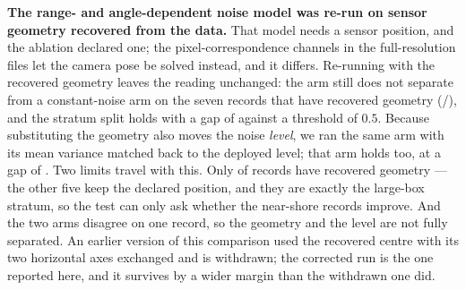 \documentclass[review]{elsarticle}
\begin{document}
\textbf{The range- and angle-dependent noise model was re-run on sensor geometry
recovered from the data.} That model needs a sensor position, and the ablation declared
one; the pixel-correspondence channels in the full-resolution files let the camera pose
be solved instead, and it differs. Re-running with the recovered geometry leaves the
reading unchanged: the arm still does not separate from a constant-noise arm on the
seven records that have recovered geometry (\RFiveBVsConst{}/\RFiveBN{}), and the
stratum split holds with a gap of \RFiveBGap{} against a threshold of $0.5$. Because
substituting the geometry also moves the noise \emph{level}, we ran the same arm with
its mean variance matched back to the deployed level; that arm holds too, at a gap of
\RFiveBMMGap{}. Two limits travel with this. Only \RFiveBN{} of \EOneN{} records have
recovered geometry --- the other five keep the declared position, and they are exactly
the large-box stratum, so the test can only ask whether the near-shore records improve.
And the two arms disagree on one record, so the geometry and the level are not fully
separated. An earlier version of this comparison used the recovered centre with its two
horizontal axes exchanged and is withdrawn; the corrected run is the one reported here,
and it survives by a wider margin than the withdrawn one did.
\end{document}
